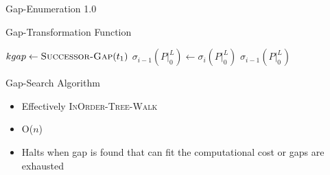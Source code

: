\documentclass{beamer}
\begin{document}
\begin{section}{Gap-Enumeration 1.0}
\begin{frame}{Gap-Transformation Function\autocite[12]{BelwalCheng}}
\begin{algorithm}[H]
\begin{multicols}{2}
{\begin{algorithmic}[2]
                  \State \Call{Gap-Insert}{$\sigma_{i}(P|_{0}^{L}), [t_{1},t)$}
                  \ExitWhile
                \EndIf
                  \State \Call{Gap-Insert}{$\sigma_{i}(P|_{0}^{L}), [t_{1},t)$}
                  \State \Call{Gap-Insert}{$\sigma_{i}(P|_{0}^{L}), [t + C_{j},t_{2})$}
                  \ExitWhile
                \EndIf
                  \State \Call{Gap-Insert}{$\sigma_{i}(P|_{0}^{L}), [t_{1},t)$}
                \EndIf
              \EndIf
                \State $kgap \gets \Call{Successor-Gap}{t_{1}}$
              \EndIf
            \EndWhile
          \EndFor
          \State $\sigma_{i-1}(P|_{0}^{L}) \gets \sigma_{i}(P|_{0}^{L})$
          \State \Return $\sigma_{i-1}(P|_{0}^{L})$
        \EndFunction
      \end{algorithmic}
    }
  \end{multicols}
  \end{algorithm}
\end{frame}
\begin{frame}{Gap-Search Algorithm\autocite[12-13]{BelwalCheng}}
  \begin{itemize}
  \item{Effectively \textsc{InOrder-Tree-Walk\autocite[245-246]{CLR}}}
  \item{O($n$)}
  \item{Halts when gap is found that can fit the computational cost or gaps are exhausted}
  \end{itemize}
\end{frame}
\end{section}
\end{document}
